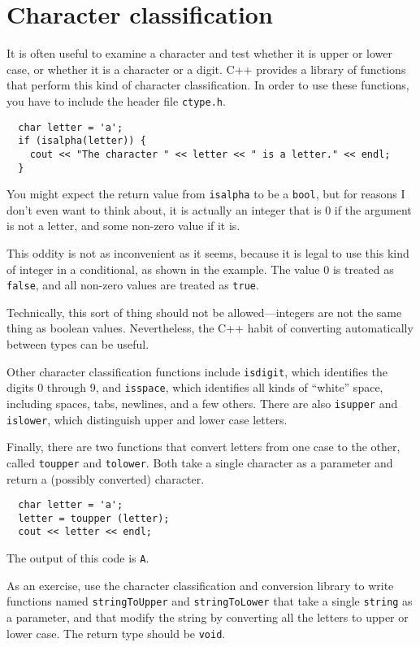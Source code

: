 \section{Character classification}

It is often useful to examine a character and test whether
it is upper or lower case, or whether it is a character or
a digit.  C++ provides a library of functions that perform
this kind of character classification.  In order to use these
functions, you have to include the header file {\tt ctype.h}.

\begin{verbatim}
  char letter = 'a';
  if (isalpha(letter)) {
    cout << "The character " << letter << " is a letter." << endl;
  }
\end{verbatim}
%
You might expect the return value from {\tt isalpha} to
be a {\tt bool}, but for reasons I don't even want to think
about, it is actually an integer that is
0 if the argument is not a letter, and some non-zero value
if it is.

This oddity is not as inconvenient as it seems, because it is
legal to use this kind of integer in a conditional, as shown
in the example.  The value 0 is treated as {\tt false}, and
all non-zero values are treated as {\tt true}.

Technically, this sort of thing should not be allowed---integers are
not the same thing as boolean values.  Nevertheless, the C++ habit of
converting automatically between types can be useful.

Other character classification functions include {\tt isdigit}, which
identifies the digits 0 through 9, and {\tt isspace}, which identifies
all kinds of ``white'' space, including spaces, tabs, newlines, and a
few others.  There are also {\tt isupper} and {\tt islower}, which
distinguish upper and lower case letters.

Finally, there are two functions that convert letters from one
case to the other, called {\tt toupper} and {\tt tolower}.  Both take
a single character as a parameter and return a (possibly
converted) character.

\begin{verbatim}
  char letter = 'a';
  letter = toupper (letter);
  cout << letter << endl;
\end{verbatim}
%
The output of this code is {\tt A}.

As an exercise, use the character classification and conversion
library to write functions named {\tt stringToUpper} and
{\tt stringToLower} that take a single {\tt string} as
a parameter, and that modify the string by converting all the
letters to upper or lower case.  The return type should be
{\tt void}.

